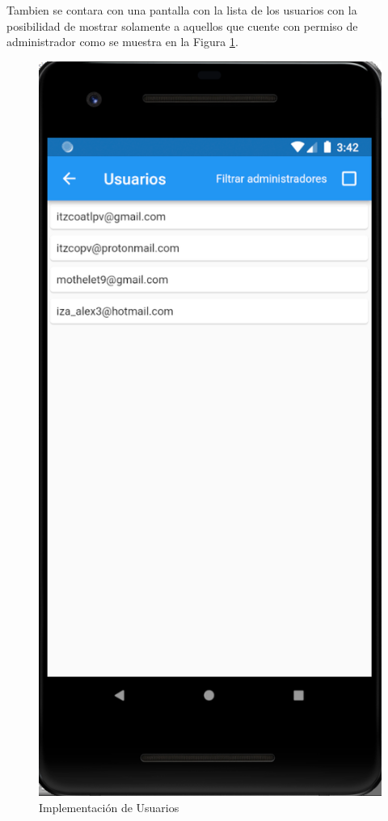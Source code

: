 \documentclass{article}
\begin{document}
Tambien se contara con una pantalla con la lista de los usuarios con la posibilidad 
de mostrar solamente a aquellos que cuente con permiso de administrador como se muestra
en la Figura \ref{fig:implementacion_08}.

\begin{figure}[H]
    \centering
    \includegraphics[scale=0.8]{imgs/Imp/Usuarios}
    \caption{Implementación de Usuarios}
    \label{fig:implementacion_08}
\end{figure}
\end{document}
